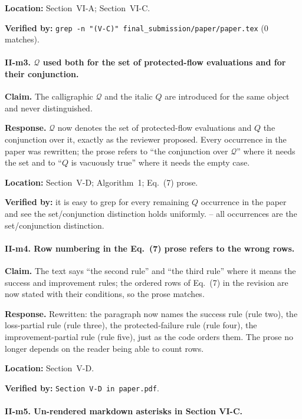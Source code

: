 \documentclass[11pt,a4paper]{article}
\begin{document}
\textbf{Location:} Section~VI-A; Section~VI-C.

\textbf{Verified by:} \texttt{grep -n "(V-C)" final\_submission/paper/paper.tex}
(0 matches).

\paragraph{II-m3. $\mathcal{Q}$ used both for the set of protected-flow
evaluations and for their conjunction.}

\textbf{Claim.} The calligraphic $\mathcal{Q}$ and the italic $Q$ are
introduced for the same object and never distinguished.

\textbf{Response.} $\mathcal{Q}$ now denotes the set of protected-flow
evaluations and $Q$ the conjunction over it, exactly as the reviewer
proposed. Every occurrence in the paper was rewritten; the prose refers to
``the conjunction over $\mathcal{Q}$'' where it needs the set and to ``$Q$ is
vacuously true'' where it needs the empty case.

\textbf{Location:} Section~V-D; Algorithm~1; Eq.~(7) prose.

\textbf{Verified by:} it is easy to grep for every remaining $Q$ occurrence in the paper and see the set/conjunction distinction holds uniformly.
-- all occurrences are the set/conjunction distinction.

\paragraph{II-m4. Row numbering in the Eq.~(7) prose refers to the wrong rows.}

\textbf{Claim.} The text says ``the second rule'' and ``the third rule''
where it means the success and improvement rules; the ordered rows of
Eq.~(7) in the revision are now stated with their conditions, so the prose
matches.

\textbf{Response.} Rewritten: the paragraph now names the success rule (rule
two), the loss-partial rule (rule three), the protected-failure rule (rule
four), the improvement-partial rule (rule five), just as the code orders
them. The prose no longer depends on the reader being able to count rows.

\textbf{Location:} Section~V-D.

\textbf{Verified by:} \texttt{Section~V-D in paper.pdf}.

\paragraph{II-m5. Un-rendered markdown asterisks in Section VI-C.}
\end{document}
